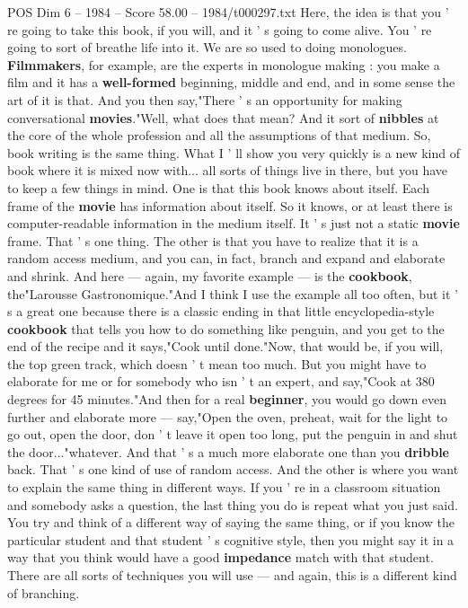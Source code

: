 \begin{textsample}{POS Dim 6 – 1984 – Score 58.00 – 1984/t000297.txt}
Here, the idea is that you ' re going to take this book, if you will, and it ' s going to come alive.
You ' re going to sort of breathe life into it.
We are so used to doing monologues. \textbf{Filmmakers}, for example, are the experts in monologue making : you make a film and it has a \textbf{well-formed} beginning, middle and end, and in some sense the art of it is that.
And you then say,"There ' s an opportunity for making conversational \textbf{movies}."Well, what does that mean?
And it sort of \textbf{nibbles} at the core of the whole profession and all the assumptions of that medium.
So, book writing is the same thing.
What I ' ll show you very quickly is a new kind of book where it is mixed now with... all sorts of things live in there, but you have to keep a few things in mind.
One is that this book knows about itself.
Each frame of the \textbf{movie} has information about itself.
So it knows, or at least there is computer-readable information in the medium itself.
It ' s just not a static \textbf{movie} frame.
That ' s one thing.
The other is that you have to realize that it is a random access medium, and you can, in fact, branch and expand and elaborate and shrink.
And here — again, my favorite example — is the \textbf{cookbook}, the"Larousse Gastronomique."And I think I use the example all too often, but it ' s a great one because there is a classic ending in that little encyclopedia-style \textbf{cookbook} that tells you how to do something like penguin, and you get to the end of the recipe and it says,"Cook until done."Now, that would be, if you will, the top green track, which doesn ' t mean too much.
But you might have to elaborate for me or for somebody who isn ' t an expert, and say,"Cook at 380 degrees for 45 minutes."And then for a real \textbf{beginner}, you would go down even further and elaborate more — say,"Open the oven, preheat, wait for the light to go out, open the door, don ' t leave it open too long, put the penguin in and shut the door..."whatever.
And that ' s a much more elaborate one than you \textbf{dribble} back.
That ' s one kind of use of random access.
And the other is where you want to explain the same thing in different ways.
If you ' re in a classroom situation and somebody asks a question, the last thing you do is repeat what you just said.
You try and think of a different way of saying the same thing, or if you know the particular student and that student ' s cognitive style, then you might say it in a way that you think would have a good \textbf{impedance} match with that student.
There are all sorts of techniques you will use — and again, this is a different kind of branching.

\end{textsample}
